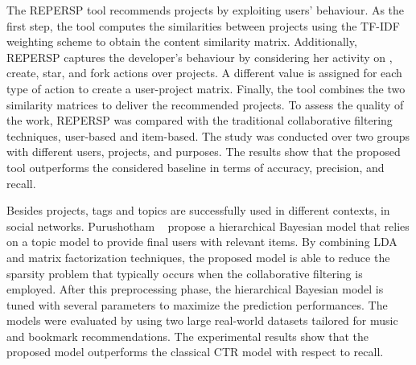 The REPERSP tool \cite{xu_repersp_2017} recommends \GH projects by exploiting 
users' behaviour. As the first step, the tool computes the similarities between 
projects using the TF-IDF weighting scheme to obtain the content similarity 
matrix. Additionally, REPERSP captures the developer's behaviour by considering 
her activity on \GH, \ie create, star, and fork actions over projects. A 
different value is assigned for each type of action to create a user-project 
matrix. Finally, the tool combines the two similarity matrices to deliver the 
recommended projects. To assess the quality of the work, REPERSP was compared 
with the traditional collaborative filtering techniques, \ie user-based and 
item-based. The study was conducted over two groups with different users, 
projects, and purposes. The results show that the proposed tool outperforms the 
considered baseline in terms of accuracy, precision, and recall. 

Besides \GH projects, tags and topics are successfully used in different 
contexts, \ie in social networks. Purushotham \etal~\cite{purushotham_collaborative_nodate} propose a hierarchical Bayesian model 
that relies on a topic model to provide final users with relevant items. By 
combining  LDA and matrix factorization techniques, the proposed model is able 
to reduce the sparsity problem that typically occurs when the collaborative 
filtering is employed. After this preprocessing phase, the hierarchical 
Bayesian model is tuned with several parameters to maximize the prediction 
performances. The models were evaluated by using two large real-world datasets 
tailored for music and bookmark recommendations. The experimental results show that the 
proposed model outperforms the classical CTR model with respect to recall. 

\vspace{-.3cm}

